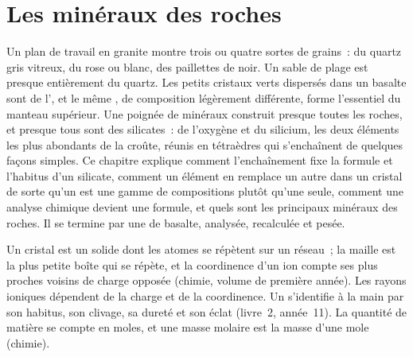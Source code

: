 \chapter{Les minéraux des roches}\label{ch:b1:rock-forming-minerals}

Un plan de travail en granite montre trois ou quatre sortes de grains~: du
quartz gris vitreux, du  rose ou blanc, des paillettes de  noir. Un
sable de plage est presque entièrement du quartz. Les petits cristaux verts
dispersés dans un basalte sont de l', et le même , de composition
légèrement différente, forme l'essentiel du manteau supérieur. Une poignée de
minéraux construit presque toutes les roches, et presque tous sont des
silicates~: de l'oxygène et du silicium, les deux éléments les plus abondants de
la croûte, réunis en tétraèdres qui s'enchaînent de quelques façons simples. Ce
chapitre explique comment l'enchaînement fixe la formule et l'habitus d'un
silicate, comment un élément en remplace un autre dans un cristal de sorte qu'un
 est une gamme de compositions plutôt qu'une seule, comment une analyse
chimique devient une formule, et quels sont les principaux minéraux des roches.
Il se termine par une  de basalte, analysée, recalculée et pesée.

\begin{recall}
Un cristal est un solide dont les atomes se répètent sur un réseau~; la maille
est la plus petite boîte qui se répète, et la coordinence d'un ion compte ses
plus proches voisins de charge opposée (chimie, volume de première année). Les
rayons ioniques dépendent de la charge et de la coordinence. Un 
s'identifie à la main par son habitus, son clivage, sa dureté et son éclat
(livre~2, année~11). La quantité de matière se compte en moles, et une masse
molaire est la masse d'une mole (chimie).
\end{recall}

